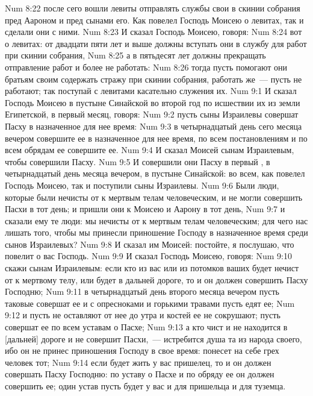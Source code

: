 \vs Num 8:22 после сего вошли левиты отправлять службы свои в скинии собрания пред Аароном и пред сынами его. Как повелел Господь Моисею о левитах, так и сделали они с ними.
\rsbpar\vs Num 8:23 И сказал Господь Моисею, говоря:
\vs Num 8:24 вот  о левитах: от двадцати пяти лет и выше должны вступать они в службу для работ при скинии собрания,
\vs Num 8:25 а в пятьдесят лет должны прекращать отправление работ и более не работать:
\vs Num 8:26 тогда пусть помогают они братьям своим содержать стражу при скинии собрания, работать же~--- пусть не работают; так поступай с левитами касательно служения их.
\vs Num 9:1 И сказал Господь Моисею в пустыне Синайской во второй год по исшествии их из земли Египетской, в первый месяц, говоря:
\vs Num 9:2 пусть сыны Израилевы совершат Пасху в назначенное для нее время:
\vs Num 9:3 в четырнадцатый день сего месяца вечером совершите ее в назначенное для нее время, по всем постановлениям и по всем обрядам ее совершите ее.
\vs Num 9:4 И сказал Моисей сынам Израилевым, чтобы совершили Пасху.
\vs Num 9:5 И совершили они Пасху в первый , в четырнадцатый день месяца вечером, в пустыне Синайской: во всем, как повелел Господь Моисею, так и поступили сыны Израилевы.
\rsbpar\vs Num 9:6 Были люди, которые были нечисты от  к мертвым телам человеческим, и не могли совершить Пасхи в тот день; и пришли они к Моисею и Аарону в тот день,
\vs Num 9:7 и сказали ему те люди: мы нечисты от  к мертвым телам человеческим; для чего нас лишать того, чтобы мы принесли приношение Господу в назначенное время среди сынов Израилевых?
\vs Num 9:8 И сказал им Моисей: постойте, я послушаю, что повелит о вас Господь.
\rsbpar\vs Num 9:9 И сказал Господь Моисею, говоря:
\vs Num 9:10 скажи сынам Израилевым: если кто из вас или из потомков ваших будет нечист от  к мертвому телу, или будет в дальней дороге, то и он должен совершить Пасху Господню;
\vs Num 9:11 в четырнадцатый день второго месяца вечером пусть таковые совершат ее и с опресноками и горькими травами пусть едят ее;
\vs Num 9:12 и пусть не оставляют от нее до утра и костей ее не сокрушают; пусть совершат ее по всем уставам о Пасхе;
\vs Num 9:13 а кто чист и не находится в [дальней] дороге и не совершит Пасхи,~--- истребится душа та из народа своего, ибо он не принес приношения Господу в свое время: понесет на себе грех человек тот;
\vs Num 9:14 если будет жить у вас пришелец, то и он должен совершать Пасху Господню: по уставу о Пасхе и по обряду ее он должен совершить ее; один устав пусть будет у вас и для пришельца и для туземца.
